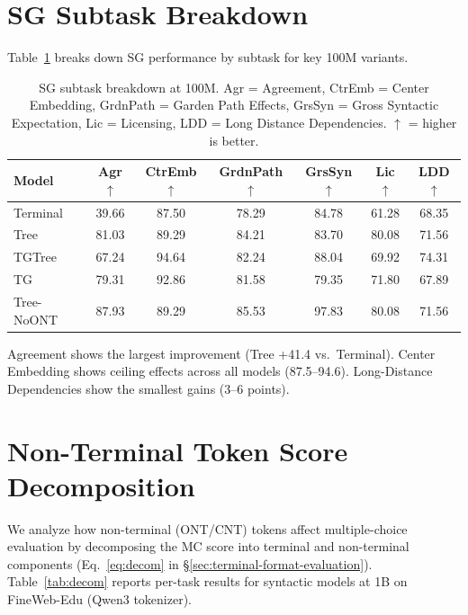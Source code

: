 \documentclass[11pt]{article}
\begin{document}
\section{SG Subtask Breakdown}

Table~\ref{tab:sg-subtasks} breaks down SG performance by subtask for key 100M variants.

\begin{table}[htbp]
  \centering
  \fontsize{8pt}{10pt}\selectfont
  \setlength{\tabcolsep}{1.8pt}
  \begin{tabular}{lcccccc}
    \toprule
    Model & Agr$\uparrow$ & CtrEmb$\uparrow$ & GrdnPath$\uparrow$ & GrsSyn$\uparrow$ & Lic$\uparrow$ & LDD$\uparrow$ \\
    \midrule
    Terminal & 39.66 & 87.50 & 78.29 & 84.78 & 61.28 & 68.35 \\
    Tree & 81.03 & 89.29 & 84.21 & 83.70 & 80.08 & 71.56 \\
    TGTree & 67.24 & 94.64 & 82.24 & 88.04 & 69.92 & 74.31 \\
    TG & 79.31 & 92.86 & 81.58 & 79.35 & 71.80 & 67.89 \\
    Tree-NoONT & 87.93 & 89.29 & 85.53 & 97.83 & 80.08 & 71.56 \\
    \bottomrule
  \end{tabular}
  \caption{SG subtask breakdown at 100M. Agr = Agreement, CtrEmb = Center Embedding, GrdnPath = Garden Path Effects, GrsSyn = Gross Syntactic Expectation, Lic = Licensing, LDD = Long Distance Dependencies. $\uparrow$ = higher is better.}
  \label{tab:sg-subtasks}
\end{table}

Agreement shows the largest improvement (Tree +41.4 vs.\ Terminal). Center Embedding shows ceiling effects across all models (87.5--94.6). Long-Distance Dependencies show the smallest gains (3--6 points).


\section{Non-Terminal Token Score Decomposition}
\label{sec:decom}

We analyze how non-terminal (ONT/CNT) tokens affect multiple-choice evaluation by decomposing the MC score into terminal and non-terminal components (Eq.~\ref{eq:decom} in \S\ref{sec:terminal-format-evaluation}).
Table~\ref{tab:decom} reports per-task results for syntactic models at 1B on FineWeb-Edu (Qwen3 tokenizer).
\end{document}
